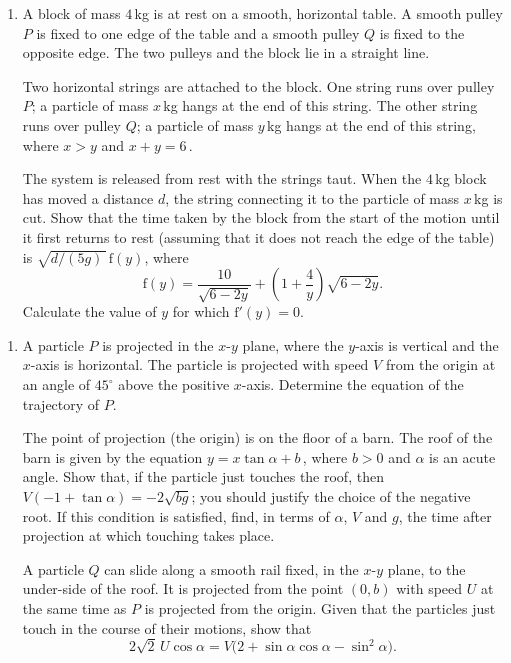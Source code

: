 \documentclass[a4, 11pt]{report}
\newlength{\qspace}
\newcounter{qnumber}
\newenvironment{question}%
 {\vspace{\qspace}
  \begin{enumerate}[\bfseries 1\quad][10]%
    \setcounter{enumi}{\value{qnumber}}%
    \item%
 }
{
  \end{enumerate}
  \filbreak
  \stepcounter{qnumber}
 }
\def\f{{\mathrm f}}
\begin{document}
	
\begin{question}
A block of mass $4\,$kg is at rest on a smooth, horizontal
table. A smooth pulley $P$ is fixed to one edge 
of the table and a  smooth pulley $Q$ is fixed to the opposite edge. 
The two pulleys and the block lie in a straight line.

Two horizontal strings are attached to the block. 
One string runs over pulley $P$; a particle of mass $x\,$kg hangs  at the end of this 
string. 
The other string runs over pulley $Q$;   a particle of mass $y\,$kg hangs
at the end of this string, where $x > y$ and $x + y = 6\,$.

The system is released from rest with the strings taut. 
When the $4\,$kg block has moved a distance $d$, 
the string connecting it to the particle of mass $x\,$kg is cut. 
Show that the time taken by the block from the 
start of the motion until it first returns to rest 
(assuming that it does not reach the edge of the table)
is $\sqrt{d/(5g)\,} \,\f(y)$, where
\[
\f(y)= \frac{10}{  \sqrt{6-2y}}+  \left(1 + \frac{4}{ y} \right) \sqrt {6 -2y}.
\]
Calculate the value of $y$ for which $\f'(y)=0$.
	\end{question}
	
\begin{question}	
A particle $P$ is projected in the $x$-$y$ plane,  where the $y$-axis
is vertical and the $x$-axis is horizontal. 
The particle is projected with speed $V$ from  the origin at an
angle of
$45 ^\circ$ above the positive $x$-axis.
Determine the equation of the trajectory 
 of $P$.



The point of projection (the origin) is on  the floor of a barn. The roof of the barn is 
given by the equation
$y= x \tan \alpha +b\,$, where $b>0$ and $\alpha$ is an acute angle. 
Show that, if  the particle just touches the roof, then  
$V(-1+ \tan\alpha) =-2 \sqrt{bg}$;  you should justify the choice of the 
negative root. 
 If this condition is satisfied,
find, in terms of $\alpha$, $V$ and $g$,
 the time after 
projection at which touching  takes place.



A particle $Q$ can slide along a 
smooth rail fixed, in the $x$-$y$ plane, to the under-side of the roof.
It is projected from the point $(0,b)$ with speed $U$
at the same time as $P$ is projected from the origin.
 Given that the particles just touch
in the course of their motions, show that
\[
2 \sqrt 2 \, U \cos \alpha  = V \big(2 +  \sin\alpha\cos\alpha -\sin^2\alpha)
.
\]
\end{question}
\end{document}
